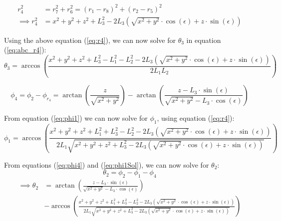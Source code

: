 \documentclass[a4paper,12pt]{article}
\begin{document}
\begin{equation}
\label{eq:r4}
\begin{aligned}
     r_{4}^{2} & = r_{7}^{2} + r_{6}^{2} = (r_{1} - r_{8})^{2} + (r_{2} - r_{5})^{2} \\
     \implies r_{4}^{2} & = x^{2} + y^{2} + z^{2} + L_{3}^{2} - 2L_{3}(\sqrt{x^{2} + y^{2}}\cdot\cos(\epsilon) + z\cdot\sin(\epsilon))
\end{aligned}
\end{equation}

Using the above equation (\ref{eq:r4}), we can now solve for $\theta_{3}$ in equation (\ref{eq:abc_r4}):
\begin{equation}
\label{eq:theta3Sol}
     \boxed{\theta_{3} = \arccos\left(\frac{x^{2} + y^{2} + z^{2} + L_{3}^{2} - L_{1}^{2} - L_{2}^{2} - 2L_{3}(\sqrt{x^{2} + y^{2}}\cdot\cos(\epsilon) + z\cdot\sin(\epsilon))}{2L_{1}L_{2}}\right)}
\end{equation}

\begin{equation}
\label{eq:phi4}
     \phi_{4} = \phi_{2} - \phi_{r_{4}} = \arctan\left(\frac{z}{\sqrt{x^{2} + y^{2}}}\right) - \arctan\left(\frac{z - L_{3}\cdot\sin(\epsilon)}{\sqrt{x^{2} + y^{2}} - L_{3}\cdot\cos(\epsilon)}\right)
\end{equation}

From equation (\ref{eq:phi1}) we can now solve for $\phi_{1}$, using equation (\ref{eq:r4}):
\begin{equation}
\label{eq:phi1Sol}
     \phi_{1} = \arccos\left(\frac{x^{2} + y^{2} + z^{2} + L_{1}^{2} + L_{3}^{2} - L_{2}^{2} - 2L_{3}(\sqrt{x^{2} + y^{2}}\cdot\cos(\epsilon) + z\cdot\sin(\epsilon))}{2L_{1}\sqrt{x^{2} + y^{2} + z^{2} + L_{3}^{2} - 2L_{3}(\sqrt{x^{2} + y^{2}}\cdot\cos(\epsilon) + z\cdot\sin(\epsilon))}}\right)
\end{equation}

From equations (\ref{eq:phi4}) and (\ref{eq:phi1Sol}), we can now solve for $\theta_{2}$:
\begin{equation}
    \theta_{2} = \phi_{2} - \phi_{1} - \phi_{4}
\end{equation}
\begin{equation}
\label{eq:theta2Sol}
\boxed{
\begin{aligned}
     \implies\theta_{2} & = \arctan\left(\frac{z - L_{3}\cdot\sin(\epsilon)}{\sqrt{x^{2} + y^{2}} - L_{3}\cdot\cos(\epsilon)}\right) \\
     &- \arccos\left(\frac{x^{2} + y^{2} + z^{2} + L_{1}^{2} + L_{3}^{2} - L_{2}^{2} - 2L_{3}(\sqrt{x^{2} + y^{2}}\cdot\cos(\epsilon) + z\cdot\sin(\epsilon))}{2L_{1}\sqrt{x^{2} + y^{2} + z^{2} + L_{3}^{2} - 2L_{3}(\sqrt{x^{2} + y^{2}}\cdot\cos(\epsilon) + z\cdot\sin(\epsilon))}}\right)
\end{aligned}
}
\end{equation}
\end{document}
